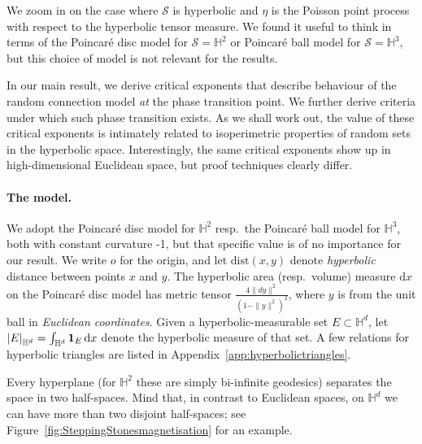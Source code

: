 \documentclass[10pt,a4paper,dvipsnames]{article}
\theoremstyle{definition}
\theoremstyle{remark}
\newcommand{\Scal}{\mathcal{S}}
\newcommand{\HypTwo}{{\mathbb{H}^2}}
\newcommand{\HypThree}{{\mathbb{H}^3}}
\newcommand{\HypDim}{{\mathbb{H}^d}}
\newcommand{\dd}{\mathrm{d}} %
\DeclarePairedDelimiter\abs{\lvert}{\rvert}
\newcommand{\habsd}[1]{\abs*{#1}_\HypDim}
\newcommand{\dist}[1]{\mathrm{dist}\left(#1\right)}
\newcommand{\orig}{o}
\numberwithin{equation}{section}
\begin{document}
We zoom in on the case where $\Scal$ is hyperbolic and $\eta$ is the Poisson point process with respect to the hyperbolic tensor measure. We found it useful to think in terms of the Poincar\'e disc model for $\Scal=\HypTwo$ or Poincar\'e ball model for $\Scal=\HypThree$, but this choice of model is not relevant for the results. 


In our main result, we derive critical exponents that describe behaviour of the random connection model \emph{at} the phase transition point. 
We further derive criteria under which such phase transition exists. 
As we shall work out, the value of these critical exponents is intimately related to isoperimetric properties of random sets in the hyperbolic space. 
Interestingly, the same critical exponents show up in high-dimensional Euclidean space, but proof techniques clearly differ. 




\paragraph{The model.}
We adopt the Poincar\'e disc model for $\HypTwo$ resp.\ the Poincar\'e ball model for $\HypThree$, both with constant curvature -1, but that specific value is of no importance for our result. 
We write $\orig$ for the origin, and let $\dist{x,y}$ denote \emph{hyperbolic} distance between points $x$ and $y$. The hyperbolic area (resp.\ volume) measure $\dd x$ on the Poincar\'e disc model has metric tensor $\frac{4\|dy\|^2}{(1-\|y\|^2)^2}$, where $y$ is from the unit ball in \emph{Euclidean coordinates}. 
Given a hyperbolic-measurable set $E\subset \HypDim$, let $\habsd{E}=\int_\HypDim\mathbf1_E \,\dd x$ denote the hyperbolic measure of that set. 
A few relations for hyperbolic triangles are listed in Appendix~\ref{app:hyperbolictriangles}. 

Every hyperplane (for $\HypTwo$ these are simply bi-infinite geodesics) separates the space in two half-spaces. Mind that, in contrast to Euclidean spaces, on $\HypDim$ we can have more than two disjoint half-spaces; see Figure~\ref{fig:SteppingStonesmagnetisation} for an example. 
\end{document}
